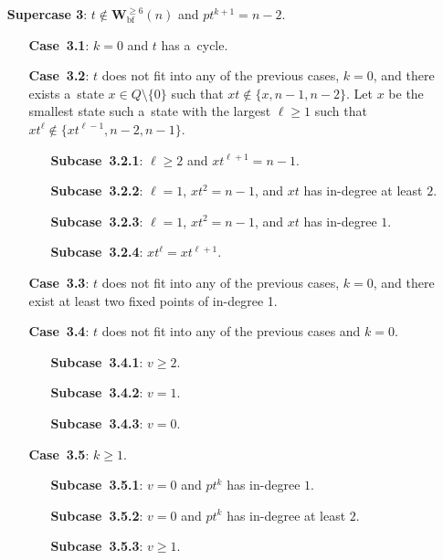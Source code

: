 \documentclass{amsart}
\renewcommand{\ge}{\geqslant}
\newcommand{\Wbf}{\mathbf{W}^{\ge 6}_{\mathrm{bf}}}
\begin{document}
{\begin{enumerate}[leftmargin=*,widest=\textbf{Supercase~1}]
\begin{enumerate}[leftmargin=*,widest=\textbf{Case~2.1}]
\end{enumerate}
\medskip
\item[\textbf{Supercase 3}:] $t \notin \Wbf(n)$ and $pt^{k+1} = n-2$.
\begin{enumerate}[leftmargin=*,widest=\textbf{Case~3.1}]
\item[\textbf{Case~3.1}:] $k=0$ and $t$ has a~cycle.
\item[\textbf{Case~3.2}:] $t$ does not fit into any of the previous cases, $k=0$, and there exists a~state $x \in Q \setminus \{0\}$ such that $xt \notin \{x,n-1,n-2\}$.
Let $x$ be the smallest state such a~state with the largest $\ell\ge 1$ such that $xt^\ell \notin \{xt^{\ell-1},n-2,n-1\}$.
\begin{enumerate}[leftmargin=*,widest=\textbf{Subcase~3.2.1}]
\item[\textbf{Subcase~3.2.1}:] $\ell \ge 2$ and $xt^{\ell+1} = n-1$.
\item[\textbf{Subcase~3.2.2}:] $\ell=1$, $xt^2 = n-1$, and $xt$ has in-degree at least $2$.
\item[\textbf{Subcase~3.2.3}:] $\ell=1$, $xt^2 = n-1$, and $xt$ has in-degree $1$.
\item[\textbf{Subcase~3.2.4}:] $xt^{\ell} = xt^{\ell+1}$.
\end{enumerate}
\item[\textbf{Case~3.3}:] $t$ does not fit into any of the previous cases, $k=0$, and there exist at least two fixed points of in-degree 1.
\item[\textbf{Case~3.4}:] $t$ does not fit into any of the previous cases and $k=0$.
\begin{enumerate}[leftmargin=*,widest=\textbf{Subcase~3.4.1}]
\item[\textbf{Subcase~3.4.1}:] $v \ge 2$.
\item[\textbf{Subcase~3.4.2}:] $v = 1$.
\item[\textbf{Subcase~3.4.3}:] $v = 0$.
\end{enumerate}
\item[\textbf{Case~3.5}:] $k \ge 1$.
\begin{enumerate}[leftmargin=*,widest=\textbf{Subcase~3.5.1}]
\item[\textbf{Subcase~3.5.1}:] $v = 0$ and $pt^k$ has in-degree $1$.
\item[\textbf{Subcase~3.5.2}:] $v = 0$ and $p t^k$ has in-degree at least $2$.
\item[\textbf{Subcase~3.5.3}:] $v \ge 1$.
\end{enumerate}
\end{enumerate}
\end{enumerate}}
\end{document}

